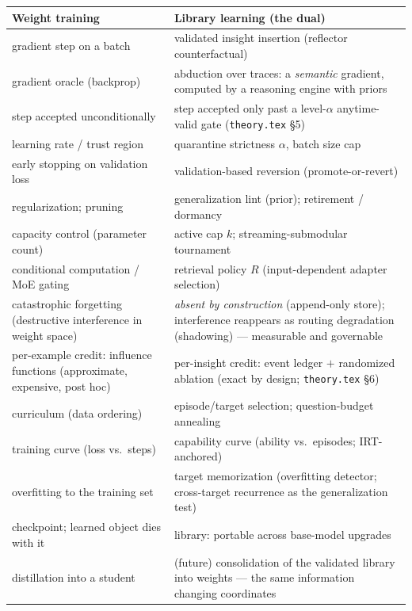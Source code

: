 \documentclass[11pt]{article}
\theoremstyle{plain}
\theoremstyle{definition}
\theoremstyle{remark}
\begin{document}
\begin{center}
\small
\begin{tabular}{@{}p{}p{}@{}}
\toprule
\textbf{Weight training} & \textbf{Library learning (the dual)} \\
\midrule
gradient step on a batch &
validated insight insertion (reflector counterfactual) \\
gradient oracle (backprop) &
abduction over traces: a \emph{semantic} gradient, computed by a reasoning
engine with priors \\
step accepted unconditionally &
step accepted only past a level-$\alpha$ anytime-valid gate
(\texttt{theory.tex} \S5) \\
learning rate / trust region &
quarantine strictness $\alpha$, batch size cap \\
early stopping on validation loss &
validation-based reversion (promote-or-revert) \\
regularization; pruning &
generalization lint (prior); retirement / dormancy \\
capacity control (parameter count) &
active cap $k$; streaming-submodular tournament \\
conditional computation / MoE gating &
retrieval policy $R$ (input-dependent adapter selection) \\
catastrophic forgetting (destructive interference in weight space) &
\emph{absent by construction} (append-only store); interference reappears as
routing degradation (shadowing) --- measurable and governable \\
per-example credit: influence functions (approximate, expensive, post hoc) &
per-insight credit: event ledger $+$ randomized ablation (exact by design;
\texttt{theory.tex} \S6) \\
curriculum (data ordering) &
episode/target selection; question-budget annealing \\
training curve (loss vs.\ steps) &
capability curve (ability vs.\ episodes; IRT-anchored) \\
overfitting to the training set &
target memorization (overfitting detector; cross-target recurrence as the
generalization test) \\
checkpoint; learned object dies with it &
library: portable across base-model upgrades \\
distillation into a student &
(future) consolidation of the validated library into weights --- the same
information changing coordinates \\
\bottomrule
\end{tabular}
\end{center}
\end{document}
